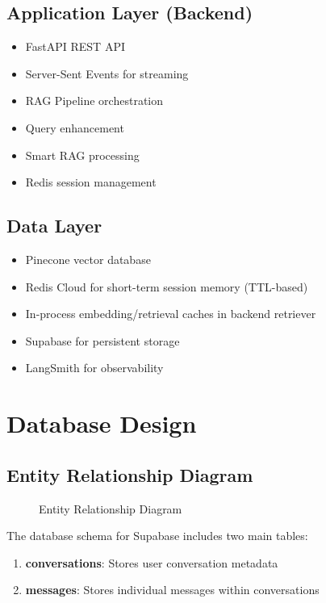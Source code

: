 \documentclass[12pt,a4paper]{book}
\numberwithin{table}{chapter}
\numberwithin{figure}{chapter}
\numberwithin{equation}{chapter}
\begin{document}
\subsection{Application Layer (Backend)}
\begin{itemize}
    \item FastAPI REST API
    \item Server-Sent Events for streaming
    \item RAG Pipeline orchestration
    \item Query enhancement
    \item Smart RAG processing
    \item Redis session management
\end{itemize}

\subsection{Data Layer}
\begin{itemize}
    \item Pinecone vector database
    \item Redis Cloud for short-term session memory (TTL-based)
    \item In-process embedding/retrieval caches in backend retriever
    \item Supabase for persistent storage
    \item LangSmith for observability
\end{itemize}

\section{Database Design}

\subsection{Entity Relationship Diagram}

\begin{figure}[h]
\caption{Entity Relationship Diagram}
\label{fig:erd}
\end{figure}

The database schema for Supabase includes two main tables:

\begin{enumerate}
    \item \textbf{conversations}: Stores user conversation metadata
    \item \textbf{messages}: Stores individual messages within conversations
\end{enumerate}
\end{document}
